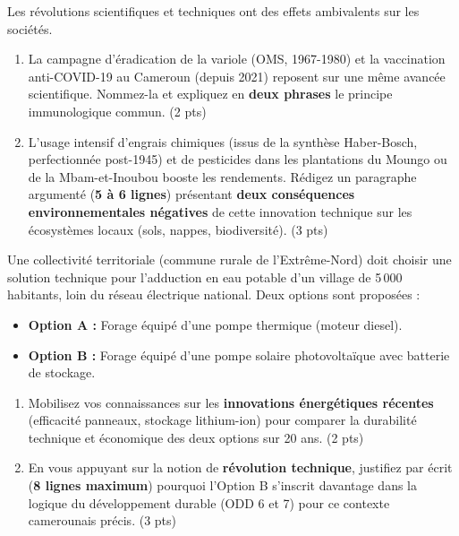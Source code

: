 \documentclass[11pt]{article}
\begin{document}
\begin{exercice}
Les révolutions scientifiques et techniques ont des effets ambivalents sur les sociétés.
\begin{enumerate}
    \item La campagne d'éradication de la variole (OMS, 1967-1980) et la vaccination anti-COVID-19 au Cameroun (depuis 2021) reposent sur une même avancée scientifique. Nommez-la et expliquez en \textbf{deux phrases} le principe immunologique commun. \hfill (2 pts)
    \item L'usage intensif d'engrais chimiques (issus de la synthèse Haber-Bosch, perfectionnée post-1945) et de pesticides dans les plantations du Moungo ou de la Mbam-et-Inoubou booste les rendements. Rédigez un paragraphe argumenté (\textbf{5 à 6 lignes}) présentant \textbf{deux conséquences environnementales négatives} de cette innovation technique sur les écosystèmes locaux (sols, nappes, biodiversité). \hfill (3 pts)
\end{enumerate}
\end{exercice}

\begin{exercice}
Une collectivité territoriale (commune rurale de l'Extrême-Nord) doit choisir une solution technique pour l'adduction en eau potable d'un village de 5\,000 habitants, loin du réseau électrique national. Deux options sont proposées :
\begin{itemize}
    \item \textbf{Option A :} Forage équipé d'une pompe thermique (moteur diesel).
    \item \textbf{Option B :} Forage équipé d'une pompe solaire photovoltaïque avec batterie de stockage.
\end{itemize}
\begin{enumerate}
    \item Mobilisez vos connaissances sur les \textbf{innovations énergétiques récentes} (efficacité panneaux, stockage lithium-ion) pour comparer la durabilité technique et économique des deux options sur 20 ans. \hfill (2 pts)
    \item En vous appuyant sur la notion de \textbf{révolution technique}, justifiez par écrit (\textbf{8 lignes maximum}) pourquoi l'Option B s'inscrit davantage dans la logique du développement durable (ODD 6 et 7) pour ce contexte camerounais précis. \hfill (3 pts)
\end{enumerate}
\end{exercice}
\end{document}

